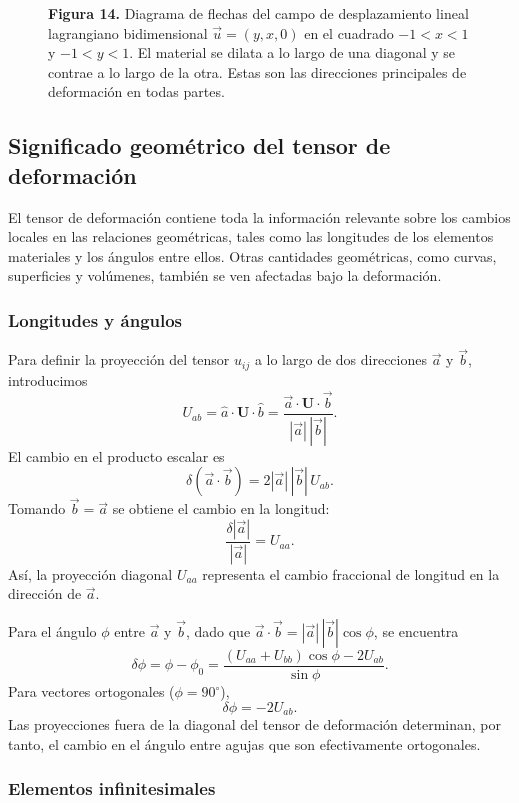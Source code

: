 \begin{figure}[H]
\centering

\par\medskip
\textbf{Figura 14.} Diagrama de flechas del campo de desplazamiento lineal lagrangiano bidimensional $\vec{u} = (y, x, 0)$ en el cuadrado $-1 < x < 1$ y $-1 < y < 1$. El material se dilata a lo largo de una diagonal y se contrae a lo largo de la otra. Estas son las direcciones principales de deformación en todas partes.
\end{figure}

\subsection{Significado geométrico del tensor de deformación}

El tensor de deformación contiene toda la información relevante sobre los cambios locales en las relaciones geométricas, tales como las longitudes de los elementos materiales y los ángulos entre ellos. Otras cantidades geométricas, como curvas, superficies y volúmenes, también se ven afectadas bajo la deformación.

\subsubsection{Longitudes y ángulos}

Para definir la proyección del tensor $u_{ij}$ a lo largo de dos direcciones $\vec{a}$ y $\vec{b}$, introducimos
\[ U_{ab} = \hat{a}\cdot\mathbf{U}\cdot\hat{b} = \frac{\vec{a}\cdot\mathbf{U}\cdot\vec{b}}{|\vec{a}|\,|\vec{b}|}. \tag{103} \]
El cambio en el producto escalar es
\[ \delta(\vec{a}\cdot\vec{b}) = 2|\vec{a}|\,|\vec{b}|\,U_{ab}. \tag{104} \]
Tomando $\vec{b} = \vec{a}$ se obtiene el cambio en la longitud:
\[ \frac{\delta|\vec{a}|}{|\vec{a}|} = U_{aa}. \tag{105} \]
Así, la proyección diagonal $U_{aa}$ representa el cambio fraccional de longitud en la dirección de $\vec{a}$.

Para el ángulo $\phi$ entre $\vec{a}$ y $\vec{b}$, dado que $\vec{a}\cdot\vec{b} = |\vec{a}|\,|\vec{b}|\cos\phi$, se encuentra
\[ \delta\phi = \phi - \phi_0 = \frac{(U_{aa} + U_{bb})\cos\phi - 2U_{ab}}{\sin\phi}. \tag{106} \]
Para vectores ortogonales ($\phi = 90^\circ$),
\[ \delta\phi = -2U_{ab}. \tag{107} \]
Las proyecciones fuera de la diagonal del tensor de deformación determinan, por tanto, el cambio en el ángulo entre agujas que son efectivamente ortogonales.

\subsubsection{Elementos infinitesimales}

